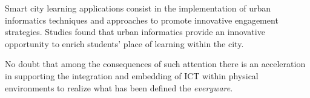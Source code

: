 Smart city learning applications consist in the implementation of urban informatics techniques and approaches to promote innovative engagement strategies\cite{amayocaldwell_urban_2013}.
Studies found that urban informatics provide an innovative opportunity to enrich students' place of learning within the city\cite{amayocaldwell_urban_2013}.

No doubt that among the consequences of such attention there is an acceleration in supporting the integration and embedding of ICT within physical environments to realize what has been defined the \textit{everyware}\cite{giffinger_smart_2007}.



